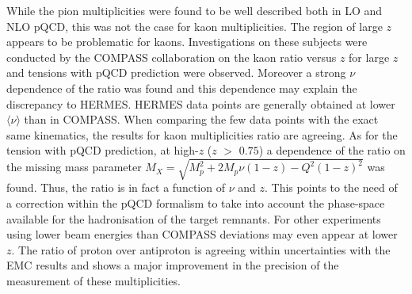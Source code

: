 While the pion multiplicities were found to be well described both in LO and NLO pQCD, this was not the case for kaon multiplicities. The region of large $z$ appears to be problematic for kaons. Investigations on these subjects were conducted by the COMPASS collaboration on the kaon ratio versus $z$ for large $z$ \cite{MarcinPubli} and tensions with pQCD prediction were observed. Moreover a strong $\nu$ dependence of the ratio was found and this dependence may explain the discrepancy to HERMES. HERMES data points are generally obtained at lower $\langle \nu \rangle$ than in COMPASS. When comparing the few data points with the exact same kinematics, the results for kaon multiplicities ratio are agreeing. As for the tension with pQCD prediction, at high-$z$ ($z$ $>$ $0.75$) a dependence of the ratio on the missing mass parameter $M_X = \sqrt{M^2_p + 2M_p \nu (1-z) - Q^2 (1-z)^2}$ was found. Thus, the ratio is in fact a function of $\nu$ and $z$. This points to the need of a correction within the pQCD formalism to take into account the phase-space available for the hadronisation of the target remnants. For other experiments using lower beam energies than COMPASS deviations may even appear at lower $z$. The ratio of proton over antiproton is agreeing within uncertainties with the EMC results and shows a major improvement in the precision of the measurement of these multiplicities.

\newpage


